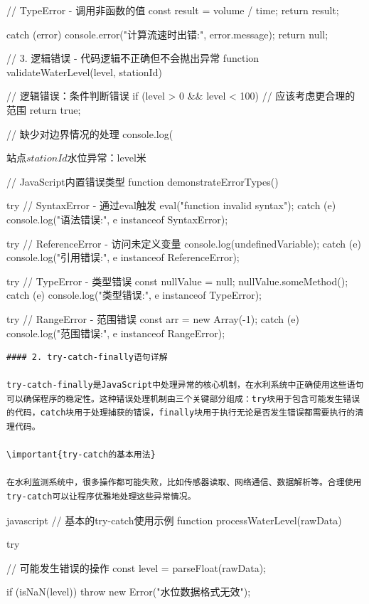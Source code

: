 {{{        // TypeError - 调用非函数的值
        const result = volume / time;
        return result;
        
    } catch (error) {
        console.error("计算流速时出错:", error.message);
        return null;
    }
}

// 3. 逻辑错误 - 代码逻辑不正确但不会抛出异常
function validateWaterLevel(level, stationId) {
    // 逻辑错误：条件判断错误
    if (level > 0 && level < 100) {  // 应该考虑更合理的范围
        return true;
    }
    
    // 缺少对边界情况的处理
    console.log(}站点${stationId}水位异常：${level}米

// JavaScript内置错误类型
function demonstrateErrorTypes() {
    try {
        // SyntaxError - 通过eval触发
        eval("function invalid syntax");
    } catch (e) {
        console.log("语法错误:", e instanceof SyntaxError);
    }
    
    try {
        // ReferenceError - 访问未定义变量
        console.log(undefinedVariable);
    } catch (e) {
        console.log("引用错误:", e instanceof ReferenceError);
    }
    
    try {
        // TypeError - 类型错误
        const nullValue = null;
        nullValue.someMethod();
    } catch (e) {
        console.log("类型错误:", e instanceof TypeError);
    }
    
    try {
        // RangeError - 范围错误
        const arr = new Array(-1);
    } catch (e) {
        console.log("范围错误:", e instanceof RangeError);
    }
}
\begin{lstlisting}
#### 2. try-catch-finally语句详解

try-catch-finally是JavaScript中处理异常的核心机制，在水利系统中正确使用这些语句可以确保程序的稳定性。这种错误处理机制由三个关键部分组成：try块用于包含可能发生错误的代码，catch块用于处理捕获的错误，finally块用于执行无论是否发生错误都需要执行的清理代码。

\important{try-catch的基本用法}

在水利监测系统中，很多操作都可能失败，比如传感器读取、网络通信、数据解析等。合理使用try-catch可以让程序优雅地处理这些异常情况。

\end{lstlisting}javascript
// 基本的try-catch使用示例
function processWaterLevel(rawData) {
    try {
        // 可能发生错误的操作
        const level = parseFloat(rawData);
        
        if (isNaN(level)) {
            throw new Error("水位数据格式无效");
        }
        
}}}
